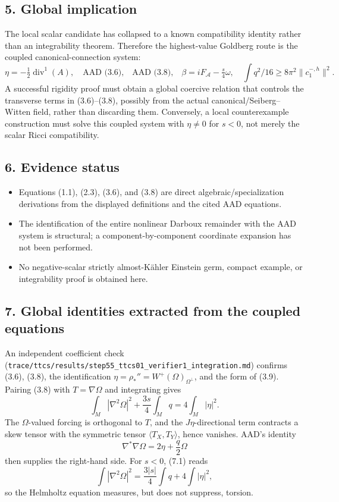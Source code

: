 \documentclass[
  10pt,
]{report}
\providecommand{\tightlist}{%
  \setlength{\itemsep}{0pt}\setlength{\parskip}{0pt}}
\begin{document}
\hypertarget{global-implication}{%
\subsection{5. Global implication}\label{global-implication}}

The local scalar candidate has collapsed to a known compatibility
identity rather than an integrability theorem. Therefore the
highest-value Goldberg route is the coupled canonical-connection system:
\[
\eta=-\tfrac12\operatorname{div}^1(A),
\quad\text{AAD (3.6),}
\quad\text{AAD (3.8),}
\quad
\beta=iF_{\mathcal A}-\tfrac s4\omega,
\quad
\int q^2/16\ge8\pi^2\|c_1^{-,h}\|^2.
\] A successful rigidity proof must obtain a global coercive relation
that controls the transverse terms in (3.6)--(3.8), possibly from the
actual canonical/Seiberg--Witten field, rather than discarding them.
Conversely, a local counterexample construction must solve this coupled
system with \(\eta\ne0\) for \(s<0\), not merely the scalar Ricci
compatibility.

\hypertarget{evidence-status}{%
\subsection{6. Evidence status}\label{evidence-status}}

\begin{itemize}
\tightlist
\item
  Equations (1.1), (2.3), (3.6), and (3.8) are direct
  algebraic/specialization derivations from the displayed definitions
  and the cited AAD equations.
\item
  The identification of the entire nonlinear Darboux remainder with the
  AAD system is structural; a component-by-component coordinate
  expansion has not been performed.
\item
  No negative-scalar strictly almost-Kähler Einstein germ, compact
  example, or integrability proof is obtained here.
\end{itemize}

\hypertarget{global-identities-extracted-from-the-coupled-equations}{%
\subsection{7. Global identities extracted from the coupled
equations}\label{global-identities-extracted-from-the-coupled-equations}}

An independent coefficient check
(\texttt{trace/ttcs/results/step55\_ttcs01\_verifier1\_integration.md})
confirms (3.6), (3.8), the identification
\(\eta=\rho_*''=W^+(\Omega)_{\Omega^\perp}\), and the form of (3.9).
Pairing (3.8) with \(T=\nabla\Omega\) and integrating gives \[
\boxed{
\int_M|\nabla^2\Omega|^2+\frac{3s}{4}\int_Mq
=4\int_M|\eta|^2.}
\tag{7.1}
\] The \(\Omega\)-valued forcing is orthogonal to \(T\), and the
\(J\eta\)-directional term contracts a skew tensor with the symmetric
tensor \(\langle T_X,T_Y\rangle\), hence vanishes. AAD's identity \[
\nabla^*\nabla\Omega=2\eta+\frac q2\Omega
\] then supplies the right-hand side. For \(s<0\), (7.1) reads \[
\int|\nabla^2\Omega|^2=\frac{3|s|}{4}\int q+4\int|\eta|^2,
\tag{7.2}
\] so the Helmholtz equation measures, but does not suppress, torsion.
\end{document}

